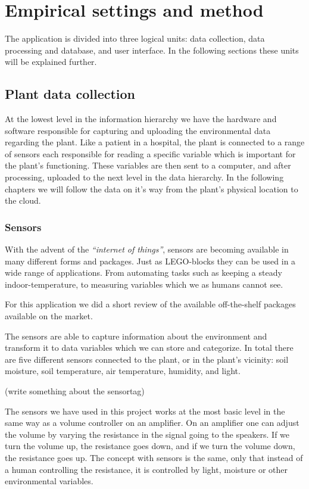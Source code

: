 \chapter{Empirical settings and method}
The application is divided into three logical units: data collection, data processing and database, and user interface. In the following sections these units will be explained further. 

\section{Plant data collection}
At the lowest level in the information hierarchy we have the hardware and software responsible for capturing and uploading the environmental data regarding the plant. Like a patient in a hospital, the plant is connected to a range of sensors each responsible for reading a specific variable which is important for the plant’s functioning. These variables are then sent to a computer, and after processing, uploaded to the next level in the data hierarchy. In the following chapters we will follow the data on it’s way from the plant’s physical location to the cloud.

\subsection{Sensors}
With the advent of the \emph{“internet of things”}, sensors are becoming available in many different forms and packages. Just as LEGO-blocks they can be used in a wide range of applications. From automating tasks such as keeping a steady indoor-temperature, to measuring variables which we as humans cannot see. 

For this application we did a short review of the available off-the-shelf packages available on the market. 

The sensors are able to capture information about the environment and transform it to data variables which we can store and categorize. In total there are five different sensors connected to the plant, or in the plant’s vicinity: soil moisture, soil temperature, air temperature, humidity, and light. 


(write something about the sensortag)

The sensors we have used in this project works at the most basic level in the same way as a volume controller on an amplifier. On an amplifier one can adjust the volume by varying the resistance in the signal going to the speakers. If we turn the volume up, the resistance goes down, and if we turn the volume down, the resistance goes up. The concept with sensors is the same, only that instead of a human controlling the resistance, it is controlled by light, moisture or other environmental variables. 

